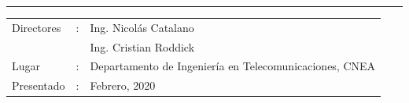 \documentclass{article}
\newenvironment{standalone}{\begin{preview}}{\end{preview}}
\begin{document}
\begin{standalone}
  \vspace{1cm}
  \hrule
  \vspace{1cm}

  {\fontsize{12pt}{12} \selectfont%
  \begin{tabular}{lcl}
    Directores &:& Ing. Nicolás Catalano\\[0.75ex]
    & & Ing. Cristian Roddick\\[1.5ex]
    Lugar &:& Departamento de Ingeniería en Telecomunicaciones, CNEA\\[1.5ex]
    Presentado &:& Febrero, 2020\\
  \end{tabular}
  }


\end{standalone}
\end{document}
